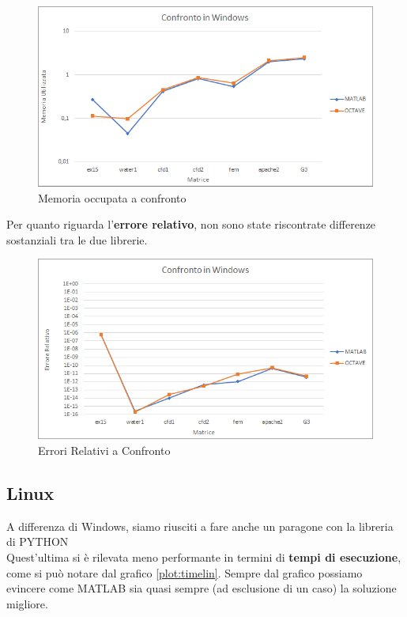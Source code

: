 \documentclass[a4paper,12pt,titlepage,oneside]{book}
\begin{document}
        \begin{figure}[ht]
            \centering
            \includegraphics[scale=0.8]{src/plot/WINmem.png}
            \caption{Memoria occupata a confronto}
            \label{plot:memwin}
        \end{figure}
        
        \newpage
        \noindent Per quanto riguarda l'\textbf{errore relativo}, non sono state riscontrate differenze sostanziali tra le due librerie.
        
        \begin{figure}[ht]
            \centering
            \includegraphics[scale=0.8]{src/plot/WINerr.png}
            \caption{Errori Relativi a Confronto}
            \label{plot:errwin}
        \end{figure}
        
        \newpage
        \subsection{Linux}
        
        \noindent A differenza di Windows, siamo riusciti a fare anche un paragone con la libreria di PYTHON\\
        Quest'ultima si è rilevata meno performante in termini di \textbf{tempi di esecuzione}, come si può notare dal grafico \ref{plot:timelin}. Sempre dal grafico possiamo evincere come MATLAB sia quasi sempre (ad esclusione di un caso) la soluzione migliore.\\
        
\end{document}
